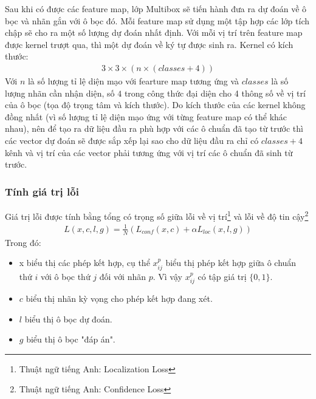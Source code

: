 \documentclass[a4paper,12pt]{article}
\begin{document}
	Sau khi có được các feature map, lớp Multibox sẽ tiến hành đưa ra dự đoán về ô bọc và nhãn gắn với ô bọc đó. Mỗi feature map sử dụng một tập hợp các lớp tích chập sẽ cho ra một số lượng dự đoán nhất định. Với mỗi vị trí trên feature map được kernel trượt qua, thì một dự đoán về ký tự được sinh ra. Kernel có kích thước:
	\begin{align}
	3 \times 3 \times (n \times (classes + 4))
	\end{align}
	Với $n$ là số lượng tỉ lệ diện mạo với fearture map tương ứng và $classes$ là số lượng nhãn cần nhận diện, số $4$ trong công thức đại diện cho 4 thông số về vị trí của ô bọc (tọa độ trọng tâm và kích thước). Do kích thước của các kernel không đồng nhất (vì số lượng tỉ lệ diện mạo ứng với từng feature map có thể khác nhau), nên để tạo ra dữ liệu đầu ra phù hợp với các ô chuẩn đã tạo từ trước thì các vector dự đoán sẽ được sắp xếp lại sao cho dữ liệu đầu ra chỉ có $classes + 4$ kênh và vị trí của các vector phải tương ứng với vị trí các ô chuẩn đã sinh từ trước.
	
	\subsubsection{Tính giá trị lỗi}
	
	Giá trị lỗi được tính bằng tổng có trọng số giữa lỗi về vị trí\footnote{Thuật ngữ tiếng Anh: Localization Loss} và lỗi về độ tin cậy\footnote{Thuật ngữ tiếng Anh: Confidence Loss}
	\begin{align}
	L(x,c,l,g) = \frac{1}{N} (L_{conf}(x,c) + \alpha L_{loc}(x,l,g) )
	\end{align}
	Trong đó:
	\begin{itemize}
		\item x biểu thị các phép kết hợp, cụ thể $x^p_{ij}$ biểu thị phép kết hợp giữa ô chuẩn thứ $i$ với ô bọc thứ $j$ đối với nhãn $p$. Vì vậy $x^p_{ij}$ có tập giá trị $\{0, 1\}$.
		\item $c$ biểu thị nhãn kỳ vọng cho phép kết hợp đang xét.
		\item $l$ biểu thị ô bọc dự đoán.
		\item $g$ biểu thị ô bọc "đáp án".
	\end{itemize}
	
\end{document}
